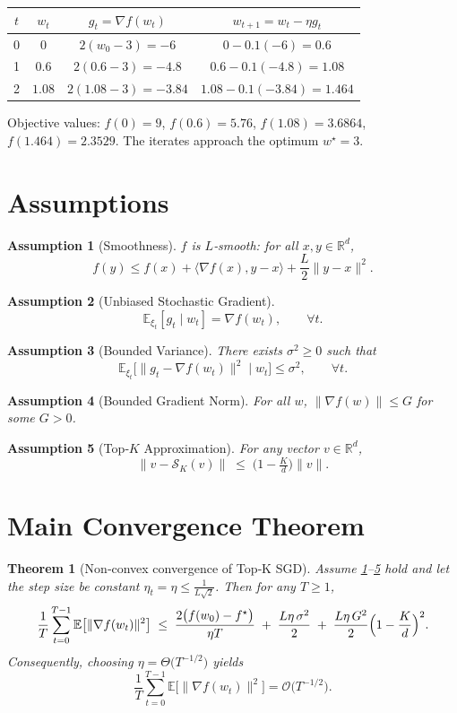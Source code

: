 \documentclass{article}
\newtheorem{theorem}{Theorem}
\newtheorem{assumption}{Assumption}
\newcommand{\topk}[1]{\mathcal{S}_K(#1)} %
\newcommand{\E}{\mathbb{E}}
\begin{document}
\begin{center}
\begin{tabular}{c|c|c|c}
$t$ & $w_t$ & $g_t=\nabla f(w_t)$ & $w_{t+1}=w_t-\eta g_t$ \\ \hline
0 & $0$ & $2(w_0-3)=-6$ & $0-0.1(-6)=0.6$ \\
1 & $0.6$ & $2(0.6-3)=-4.8$ & $0.6-0.1(-4.8)=1.08$ \\
2 & $1.08$ & $2(1.08-3)=-3.84$ & $1.08-0.1(-3.84)=1.464$ \\
\end{tabular}
\end{center}
Objective values: $f(0)=9$, $f(0.6)=5.76$, $f(1.08)=3.6864$, $f(1.464)=2.3529$.  The iterates approach the optimum $w^\star=3$.

\newpage
\section*{Assumptions}
\begin{assumption}[Smoothness]\label{as:smooth}
$f$ is $L$‑smooth: for all $x,y\in\mathbb{R}^d$,
\[
f(y)\le f(x)+\langle\nabla f(x),y-x\rangle+\frac{L}{2}\|y-x\|^2 .
\]
\end{assumption}
\begin{assumption}[Unbiased Stochastic Gradient]\label{as:unbiased}
\[
\E_{\xi_t}[g_t\mid w_t]=\nabla f(w_t),\qquad\forall t .
\]
\end{assumption}
\begin{assumption}[Bounded Variance]\label{as:variance}
There exists $\sigma^2\ge0$ such that
\[
\E_{\xi_t}\big[\|g_t-\nabla f(w_t)\|^2\mid w_t\big]\le\sigma^2,\qquad\forall t .
\]
\end{assumption}
\begin{assumption}[Bounded Gradient Norm]\label{as:bound}
For all $w$, $\|\nabla f(w)\|\le G$ for some $G>0$.
\end{assumption}
\begin{assumption}[Top‑$K$ Approximation]\label{as:sparsify}
For any vector $v\in\mathbb{R}^d$,
\[
\|v-\topk{v}\| \;\le\; \bigl(1-\tfrac{K}{d}\bigr)\|v\|.
\]
\end{assumption}

\section*{Main Convergence Theorem}
\begin{theorem}[Non‑convex convergence of Top‑K SGD]\label{thm:main}
Assume \ref{as:smooth}–\ref{as:sparsify} hold and let the step size be constant $\eta_t=\eta\le \frac{1}{L\sqrt{2}}$. Then for any $T\ge1$,
\[
\frac{1}{T}\sum_{t=0}^{T-1}\E\big[\|\nabla f(w_t)\|^2\big]
\;\le\;
\frac{2\big(f(w_0)-f^\star\big)}{\eta T}
\;+\;
\frac{L\eta\,\sigma^2}{2}
\;+\;
\frac{L\eta\,G^2}{2}\Bigl(1-\frac{K}{d}\Bigr)^2 .
\]
Consequently, choosing $\eta = \Theta\!\big(T^{-1/2}\big)$ yields
\[
\frac{1}{T}\sum_{t=0}^{T-1}\E\big[\|\nabla f(w_t)\|^2\big]=\mathcal{O}\!\big(T^{-1/2}\big).
\]
\end{theorem}
\end{document}
